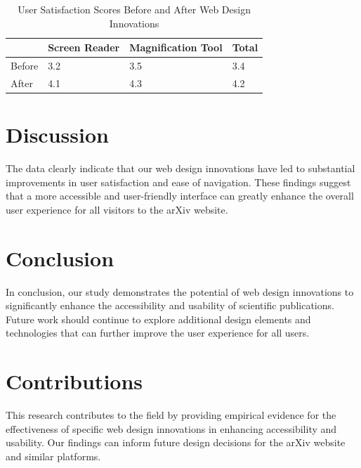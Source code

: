 \documentclass{article}
\begin{document}
\begin{table}[ht]
\centering
\caption{User Satisfaction Scores Before and After Web Design Innovations}
\label{tab:user_satisfaction}
\begin{tabular}{@{}llll@{}}
\toprule
& Screen Reader & Magnification Tool & Total \\
\midrule
Before & 3.2 & 3.5 & 3.4 \\
After & 4.1 & 4.3 & 4.2 \\
\bottomrule
\end{tabular}
\end{table}

\section{Discussion}
The data clearly indicate that our web design innovations have led to substantial improvements in user satisfaction and ease of navigation. These findings suggest that a more accessible and user-friendly interface can greatly enhance the overall user experience for all visitors to the arXiv website.

\section{Conclusion}
In conclusion, our study demonstrates the potential of web design innovations to significantly enhance the accessibility and usability of scientific publications. Future work should continue to explore additional design elements and technologies that can further improve the user experience for all users.

\section{Contributions}
This research contributes to the field by providing empirical evidence for the effectiveness of specific web design innovations in enhancing accessibility and usability. Our findings can inform future design decisions for the arXiv website and similar platforms.



\end{document}
